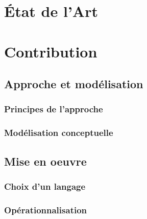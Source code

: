 \part*{État de l'Art}














\part*{Contribution}

\chapter{Approche et modélisation}\label{chap:mod}
\section{Principes de l'approche}\label{sec:principes}
\section{Modélisation conceptuelle}\label{sec:concept}

\chapter{Mise en oeuvre}\label{chap:op}
\section{Choix d'un langage}\label{sec:ln}
\section{Opérationnalisation}\label{sec:op}


